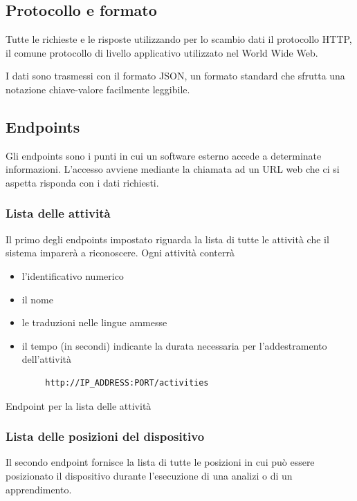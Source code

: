 \subsection{Protocollo e formato}
Tutte le richieste e le risposte utilizzando per lo scambio dati il protocollo HTTP, il comune protocollo di livello 
applicativo utilizzato nel World Wide Web.

I dati sono trasmessi con il formato JSON, un formato standard che sfrutta una notazione chiave-valore facilmente leggibile.


\subsection{Endpoints}
Gli endpoints sono i punti in cui un software esterno accede a determinate informazioni. L'accesso avviene mediante la chiamata ad un URL 
web che ci si aspetta risponda con i dati richiesti.

\subsubsection{Lista delle attività}
Il primo degli endpoints impostato riguarda la lista di tutte le attività che il sistema imparerà a riconoscere.
Ogni attività conterrà
\begin{itemize}
    \item l'identificativo numerico
    \item il nome
    \item le traduzioni nelle lingue ammesse
    \item il tempo (in secondi) indicante la durata necessaria per l'addestramento dell'attività
\end{itemize}

\begin{listing}[H] 
    \begin{verbatim}
        http://IP_ADDRESS:PORT/activities
    \end{verbatim}
    \caption{Endpoint per la lista delle attività}
    \label{listing:endpoint-activities}
\end{listing}

\subsubsection{Lista delle posizioni del dispositivo}
Il secondo endpoint fornisce la lista di tutte le posizioni in cui può essere posizionato il dispositivo durante l'esecuzione 
di una analizi o di un apprendimento.

